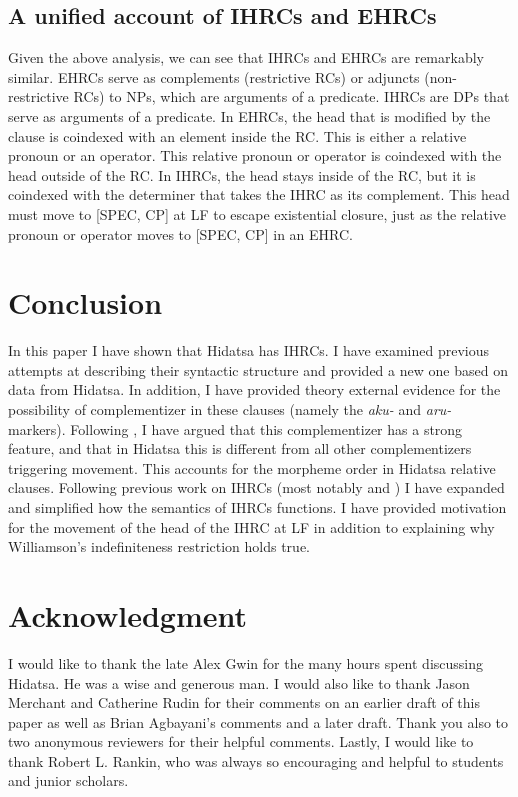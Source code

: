 \documentclass[output=paper]{LSP/langsci}
\begin{document}
\subsection{A unified account of IHRCs and EHRCs}\label{sec:boyle:6.5}

Given the above analysis, we can see that IHRCs and EHRCs are remarkably similar. EHRCs serve as complements (restrictive RCs) or adjuncts (non-restrictive RCs) to NPs, which are arguments of a predicate. IHRCs are DPs that serve as arguments of a predicate. In EHRCs, the head that is modified by the clause is coindexed with an element inside the RC. This is either a relative pronoun or an operator. This relative pronoun or operator is coindexed with the head outside of the RC. In IHRCs, the head stays inside of the RC, but it is coindexed with the determiner that takes the IHRC as its complement. This head must move to [SPEC, CP] at LF to escape existential closure, just as the relative pronoun or operator moves to [SPEC, CP] in an EHRC.

\section{Conclusion}\label{sec:boyle:7}

In this paper I have shown that Hidatsa has IHRCs. I have examined previous attempts at describing their syntactic structure and provided a new one based on data from Hidatsa. In addition, I have provided theory external evidence for the possibility of complementizer in these clauses (namely the \textit{aku-} and \textit{aru-} markers). Following \citet{Culy1990}, I have argued that this complementizer has a strong feature, and that in Hidatsa this is different from all other complementizers triggering movement. This accounts for the morpheme order in Hidatsa relative clauses.  Following previous work on IHRCs (most notably \citealt{Williamson1987} and \citealt{Culy1990}) I have expanded and simplified how the semantics of IHRCs functions. I have provided motivation for the movement of the head of the IHRC at LF in addition to explaining why Williamson's indefiniteness restriction holds true.

\section*{Acknowledgment}

I would like to thank the late Alex Gwin for the many hours spent discussing Hidatsa. He was a wise and generous man. I would also like to thank Jason Merchant and Catherine Rudin for their comments on an earlier draft of this paper as well as Brian Agbayani's comments and a later draft. Thank you also to two anonymous reviewers for their helpful comments. Lastly, I would like to thank Robert L. Rankin, who was always so encouraging and helpful to students and junior scholars.
\end{document}
